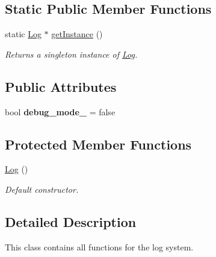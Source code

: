 \subsection*{Static Public Member Functions}
\begin{DoxyCompactItemize}
\item 
static \hyperlink{class_log}{Log} $\ast$ \hyperlink{class_log_a987f3ff401eea783d0e80daaea1d7aca}{get\-Instance} ()
\begin{DoxyCompactList}\small\item\em Returns a singleton instance of \hyperlink{class_log}{Log}. \end{DoxyCompactList}\end{DoxyCompactItemize}
\subsection*{Public Attributes}
\begin{DoxyCompactItemize}
\item 
\hypertarget{class_log_a12ba1925c1d6b0d363cafbca538da3e6}{bool {\bfseries debug\-\_\-mode\-\_\-} = false}\label{class_log_a12ba1925c1d6b0d363cafbca538da3e6}

\end{DoxyCompactItemize}
\subsection*{Protected Member Functions}
\begin{DoxyCompactItemize}
\item 
\hypertarget{class_log_af6071a60aa52b6c1b511f99b4bc1b8fe}{\hyperlink{class_log_af6071a60aa52b6c1b511f99b4bc1b8fe}{Log} ()}\label{class_log_af6071a60aa52b6c1b511f99b4bc1b8fe}

\begin{DoxyCompactList}\small\item\em Default constructor. \end{DoxyCompactList}\end{DoxyCompactItemize}


\subsection{Detailed Description}
This class contains all functions for the log system. 

